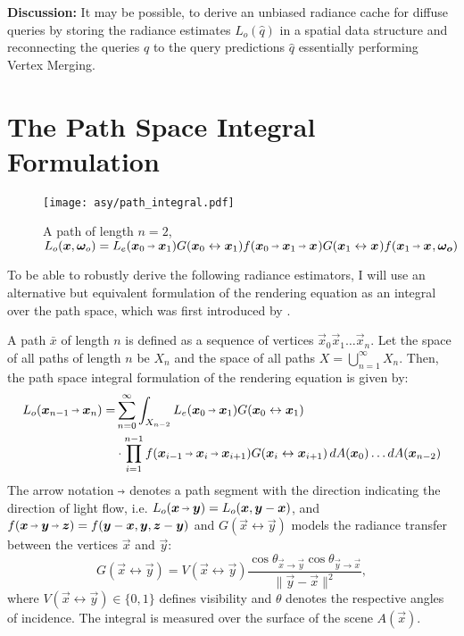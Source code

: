 \textbf{Discussion:} It may be possible, to derive an unbiased radiance cache for diffuse queries by storing the radiance estimates $L_o(\hat{q})$ in a spatial data structure and reconnecting the queries $q$ to the query predictions $\hat{q}$ essentially performing Vertex Merging. %

\section{The Path Space Integral Formulation}
\begin{figure}[ht]
    \centering
    \texttt{[image: asy/path\_integral.pdf]}
\caption{A path of length $n=2$, $L_o(\vec{x}, \wo) = L_e(\pdir{0}{1}) \G{0}{1} \f{0}{1}{} \G{1}{} f(\pdir{1}{}, \vec{\omega_o})$}
\end{figure}
To be able to robustly derive the following radiance estimators, I will use an alternative but equivalent formulation of the rendering equation as an integral over the path space, which was first introduced by \textcite{veach1997}.

A path $\bar{x}$ of length $n$ is defined as a sequence of vertices $\vec{x}_0 \vec{x}_1 \dots \vec{x}_n$.
Let the space of all paths of length $n$ be $X_n$ and the space of all paths $X = \bigcup_{n=1}^{\infty} X_n$.
Then, the path space integral formulation of the rendering equation is given by:
\begin{equation}
\label{eq:path_space_integral}
\begin{aligned}
    L_o(\pdir{n-1}{n})
    = &\sum_{n=0}^{\infty} \int_{X_{n-2}} L_e(\pdir{0}{1}) \G{0}{1} \\
    &\cdot \prod_{i=1}^{n - 1} \f{i-1}{i}{i+1} \G{i}{i+1}
    \diff A(\vec{x}_0) \dots \diff A(\vec{x}_{n-2})
\end{aligned}
\end{equation}
The arrow notation $\pto$ denotes a path segment with the direction indicating the direction of light flow, i.e. $L_o(\vec{x} \pto \vec{y})=L_o(\vec{x}, \vec{y} - \vec{x})$, and $f(\vec{x} \pto \vec{y} \pto \vec{z})=f(\vec{y} - \vec{x}, \vec{y}, \vec{z} - \vec{y})$ and $G(\vec{x} \leftrightarrow \vec{y})$ models the radiance transfer between the vertices $\vec{x}$ and $\vec{y}$:
\begin{equation}
\label{eq:transfer}
G(\vec{x} \leftrightarrow \vec{y}) = V(\vec{x} \leftrightarrow \vec{y}) \frac{\cos \theta_{\vec{x} \to \vec{y}} \cos \theta_{\vec{y} \to \vec{x}}}{\|\vec{y} - \vec{x}\|^2},
\end{equation}
where $V(\vec{x} \leftrightarrow \vec{y}) \in \{0,1\}$ defines visibility and $\theta$ denotes the respective angles of incidence.
The integral is measured over the surface of the scene $A(\vec{x})$.

